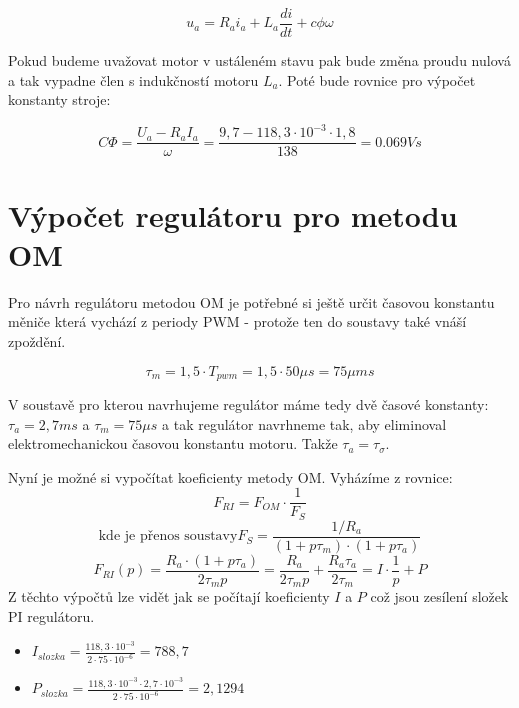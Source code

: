 \documentclass{protokol}
\begin{document}
\begin{equation}
    u_a = R_ai_a + L_a\frac{di}{dt} + c\phi\omega
    \label{eq:RovniceMotoru}
\end{equation}

Pokud budeme uvažovat motor v ustáleném stavu pak bude změna proudu nulová a tak vypadne člen s indukčností motoru $L_a$. Poté bude rovnice pro výpočet konstanty stroje:

\begin{equation}
    C\Phi{} = \frac{U_a-R_aI_a}{\omega} = \frac{9,7 - 118,3\cdot{10^{-3}}\cdot{}1,8}{138} = 0.069Vs
    \label{eq:VypocetCPhiStroje}
\end{equation}

\section{Výpočet regulátoru pro metodu OM}
Pro návrh regulátoru metodou OM je potřebné si ještě určit časovou konstantu měniče která vychází z periody PWM - protože ten do soustavy také vnáší zpoždění.

\begin{equation}
    \tau_m = 1,5\cdot{}T_{pwm} = 1,5\cdot{}50\mu{}s = 75\mu{}ms
    \label{eq:VypocetCasoveKonstantyMotoru}
\end{equation}

V soustavě pro kterou navrhujeme regulátor máme tedy dvě časové konstanty: $\tau_a = 2,7 ms$ a $\tau_m = 75\mu{}s$ a tak regulátor navrhneme tak, aby eliminoval elektromechanickou časovou konstantu motoru. Takže $\tau_a = \tau_{\sigma}$.

Nyní je možné si vypočítat koeficienty metody OM. Vyházíme z rovnice:
\begin{equation}
    F_{RI} = F_{OM}\cdot\frac{1}{F_S}
\end{equation}
\begin{equation}
    \text{kde je přenos soustavy} F_S = \frac{1/R_a}{(1 + p\tau_m)\cdot{}(1+p\tau_a)}
\end{equation}
\begin{equation}
    F_{RI}(p) = \frac{R_a\cdot{}(1+p\tau_a)}{2\tau_mp} = \frac{R_a}{2\tau_mp} + \frac{R_a\tau_a}{2\tau_m} = I\cdot{}\frac{1}{p} + P
\end{equation}
Z těchto výpočtů lze vidět jak se počítají koeficienty $I$ a $P$ což jsou zesílení složek PI regulátoru.
\begin{itemize}
    \item $I_{slozka} = \frac{118,3\cdot{}10^{-3}}{2\cdot{}75\cdot{}10^{-6}} = 788,7$
    \item $P_{slozka} = \frac{118,3\cdot{}10^{-3}\cdot{}2,7\cdot{}10^{-3}}{2\cdot{}75\cdot{}10^{-6}} = 2,1294$
\end{itemize}
\end{document}
